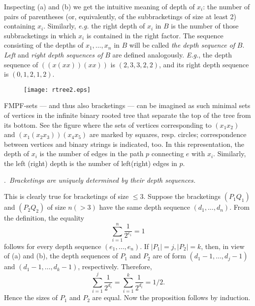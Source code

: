 \documentclass[a4paper,reqno]{amsart}\usepackage{amssymb,latexsym}
\theoremstyle{definition}
\theoremstyle{remark}
\numberwithin{equation}{section}
\numberwithin{theorem}{section}
\begin{document}
Inspecting (a) and (b) we get the intuitive meaning of depth of $x_{i}$: the
number of pairs of parentheses (or, equivalently, of the subbracketings of
size at least 2\thinspace) containing $x_{i}$. Similarly, \textit{e.g.} the
right depth of $x_{i}$ in $B$ is the number of those subbracketings in which
$x_{i}$ is contained in the right factor. The sequence consisting of the
depths of $x_{1},\ldots,x_{n}$ in $B$ will be called \textit{the depth
sequence of }$B$. \textit{Left} and \textit{right depth sequences of} $B$ are
defined analogously. \textit{E.g.}, the depth sequence of $((x(xx))(xx))$ is
$(2,3,3,2,2)$, and its right depth sequence is $(0,1,2,1,2)$.
\begin{figure}
[ptb]
\begin{center}
\texttt{[image: rtree2.eps]}\end{center}
\end{figure}

FMPF-sets --- and thus also bracketings --- can be imagined as such minimal
sets of vertices in the infinite binary rooted tree that separate the top of
the tree from its bottom. See the figure where the sets of vertices
corresponding to $(x_{1}x_{2})$ and $(x_{1}(x_{2}x_{3}))(x_{4}x_{5})$ are
marked by squares, resp. circles; correspondence between vertices and binary
strings is indicated, too. In this representation, the depth of $x_{i}$ is the
number of edges in the path $p$ connecting $e$ with $x_{i}$. Similarly, the
left (right) depth is the number of left(right) edges in $p$.

\bigskip

.\textit{\ Bracketings are uniquely determined by their depth
sequences.}

\smallskip

This is clearly true for bracketings of size $\leq3$. Suppose the bracketings
$(P_{1}Q_{1})$ and $(P_{2}Q_{2})$ of size $n(>3)$ have the same depth sequence
$(d_{1},\ldots,d_{n})$. From the definition, the equality\begin{equation}
\sum_{i=1}^{n}{\frac{1}{2^{e_{i}}}}=1 \tag{1}\end{equation}
follows for every depth sequence $(e_{1},\ldots,e_{n})$. If $|P_{1}|=j,|P_{2}|=k$, then, in view of (a) and (b), the depth sequences of $P_{1}$
and $P_{2}$ are of form $(d_{1}-1,\ldots,d_{j}-1)$ and $(d_{1}-1,\ldots
,d_{k}-1)$, respectively. Therefore,\[
\sum_{i=1}^{j}{\frac{1}{2^{d_{i}}}}=\sum_{i=1}^{k}{\frac{1}{2^{d_{i}}}}=1/2.
\]
Hence the sizes of $P_{1}$ and $P_{2}$ are equal. Now the proposition follows
by induction.
\end{document}
